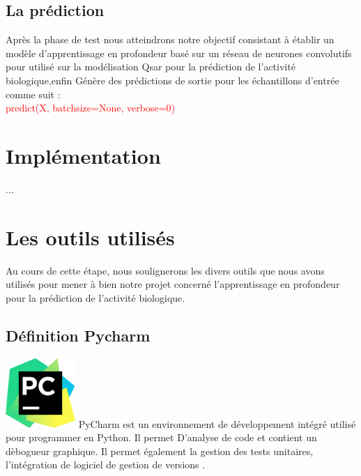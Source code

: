 \documentclass[12pt]{report}
\begin{document}
\subsection{La prédiction }
Après la phase de test nous atteindrons notre objectif consistant à établir un modèle d'apprentissage en profondeur basé sur un réseau de neurones convolutifs pour utilisé sur la modélisation Qsar pour la prédiction de l'activité biologique,enfin Génère des prédictions de sortie pour les échantillons d'entrée comme suit :\\
\textcolor{red}{predict(X, batchsize=None, verbose=0)} \cite{ref31}
\newpage
\section{Implémentation}
...
\newpage
\section{Les outils utilisés}
Au cours de cette étape, nous soulignerons les divers outils que nous avons utilisés pour mener à bien notre projet concerné l'apprentissage en profondeur pour la prédiction de l'activité biologique.
\subsection{Définition Pycharm }
\begin{multicols}
\includegraphics[width=100]{PyCharm.png}
PyCharm est un environnement de développement intégré utilisé pour programmer en Python.
Il permet D'analyse de code et contient un dèbogueur graphique. Il permet également la gestion des tests unitaires, l'intégration de logiciel de gestion de versions  \cite{ref32}.

\end{multicols}
\end{document}
